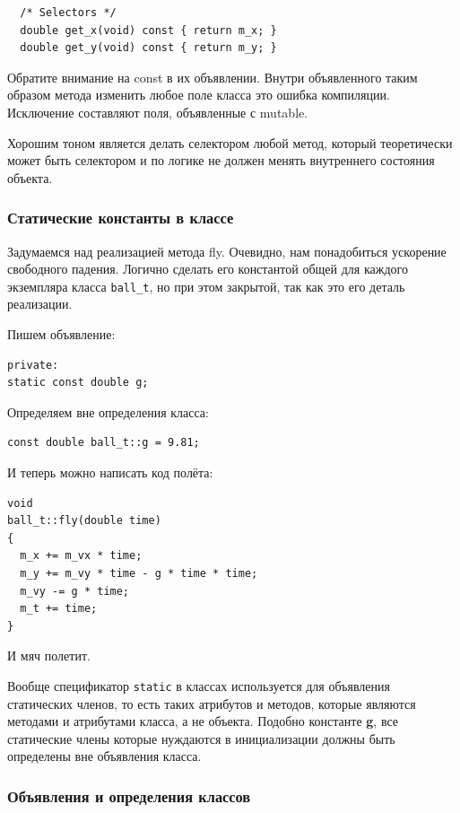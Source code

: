 \documentclass[a4paper,12pt,oneside]{article}
\begin{document}
\begin{lstlisting}
  /* Selectors */
  double get_x(void) const { return m_x; }
  double get_y(void) const { return m_y; }
\end{lstlisting}

Обратите внимание на const в их объявлении. Внутри объявленного таким образом метода изменить любое поле класса это ошибка компиляции. Исключение составляют поля, объявленные с mutable.

Хорошим тоном является делать селектором любой метод, который теоретически может быть селектором и по логике не должен менять внутреннего состояния объекта.

\subsubsection{Статические константы в классе}

Задумаемся над реализацией метода fly. Очевидно, нам понадобиться ускорение свободного падения. Логично сделать его константой общей для каждого экземпляра класса \lstinline!ball_t!, но при этом закрытой, так как это его деталь реализации.

Пишем объявление:

\begin{lstlisting}
private:
static const double g;
\end{lstlisting}

Определяем вне определения класса:

\begin{lstlisting}
const double ball_t::g = 9.81;
\end{lstlisting}

И теперь можно написать код полёта:

\begin{lstlisting}
void
ball_t::fly(double time)
{
  m_x += m_vx * time;
  m_y += m_vy * time - g * time * time;
  m_vy -= g * time;
  m_t += time;
}
\end{lstlisting}

И мяч полетит. 

Вообще спецификатор \lstinline!static! в классах используется для объявления статических членов, то есть таких атрибутов и методов, которые являются методами и атрибутами класса, а не объекта. Подобно константе \textbf{g}, все статические члены которые нуждаются в инициализации должны быть определены вне объявления класса.

\subsubsection{Объявления и определения классов}
\end{document}
